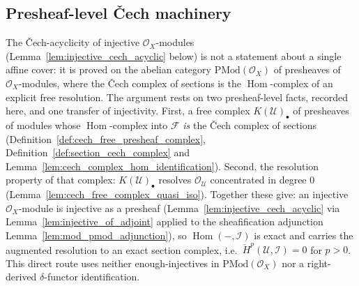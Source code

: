 \subsection{Presheaf-level {\v C}ech machinery}
\label{sec:presheaf_cech_machinery}

The {\v C}ech-acyclicity of injective \(\mathcal{O}_X\)-modules
(Lemma~\ref{lem:injective_cech_acyclic} below) is not a statement about a single
affine cover: it is proved on the abelian category \(\mathrm{PMod}(\mathcal{O}_X)\)
of presheaves of \(\mathcal{O}_X\)-modules, where the {\v C}ech complex of sections
is the \(\operatorname{Hom}\)-complex of an explicit free resolution. The argument
rests on two presheaf-level facts, recorded here, and one transfer of injectivity.
First, a free complex \(K(\mathcal{U})_\bullet\) of presheaves of modules whose
\(\operatorname{Hom}\)-complex into \(\mathcal{F}\) \emph{is} the {\v C}ech complex
of sections (Definition~\ref{def:cech_free_presheaf_complex},
Definition~\ref{def:section_cech_complex} and
Lemma~\ref{lem:cech_complex_hom_identification}). Second, the resolution property of
that complex: \(K(\mathcal{U})_\bullet\) resolves \(\mathcal{O}_{\mathcal{U}}\)
concentrated in degree \(0\) (Lemma~\ref{lem:cech_free_complex_quasi_iso}). Together
these give: an injective \(\mathcal{O}_X\)-module is injective as a presheaf
(Lemma~\ref{lem:injective_cech_acyclic} via
Lemma~\ref{lem:injective_of_adjoint} applied to the sheafification adjunction
Lemma~\ref{lem:mod_pmod_adjunction}), so \(\operatorname{Hom}(-, \mathcal{I})\) is
exact and carries the augmented resolution to an exact section complex, i.e.\
\(\check{H}^p(\mathcal{U}, \mathcal{I}) = 0\) for \(p > 0\). This direct route uses
neither enough-injectives in \(\mathrm{PMod}(\mathcal{O}_X)\) nor a right-derived
\(\delta\)-functor identification.

